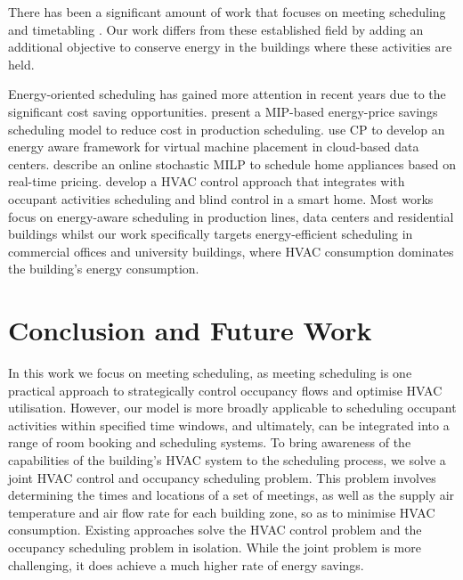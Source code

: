 There has been a significant amount of work that focuses on meeting scheduling \citep{modi2004multiagent,refanidis2010constraint,tran2016smart} and timetabling \citep{merlot2002hybrid,di2002multi,abdullah2007tabu}. Our work differs from these established field by adding an additional objective to conserve energy in the buildings where these activities are held. 

Energy-oriented scheduling has gained more attention in recent years due to the significant cost saving opportunities. 
\cite{ifrim2012properties} present a MIP-based energy-price savings scheduling model to reduce cost in production scheduling. \cite{dupont2012energy} use CP to develop an energy aware framework for virtual machine placement in cloud-based data centers. \cite{scott2013residential} describe an online stochastic MILP to schedule home appliances based on real-time pricing. \cite{ono2012risk} develop a HVAC control approach that integrates with occupant activities scheduling and blind control in a smart home.  Most works focus on energy-aware scheduling in production lines, data centers and residential buildings whilst our work specifically targets energy-efficient scheduling in commercial offices and university buildings, where HVAC consumption dominates the building's energy consumption. 



\section{Conclusion and Future Work}
\label{sec:mip:conclusion}

In this work we focus on meeting scheduling, as meeting scheduling is one practical approach to strategically control occupancy flows and optimise HVAC utilisation. However, our model is more broadly applicable to scheduling occupant activities within specified time windows, and ultimately, can be integrated into a range of room booking and scheduling systems. To bring awareness of the capabilities of the building's HVAC system to the scheduling process, we solve a joint HVAC control and occupancy scheduling problem. This problem involves determining the times and locations of a set of meetings, as well as the supply air temperature and air flow rate for  each building zone, so as to minimise HVAC consumption. Existing approaches solve the HVAC control problem and the occupancy scheduling problem in isolation. While the joint problem is more challenging, it does achieve a much higher rate of energy savings. 

